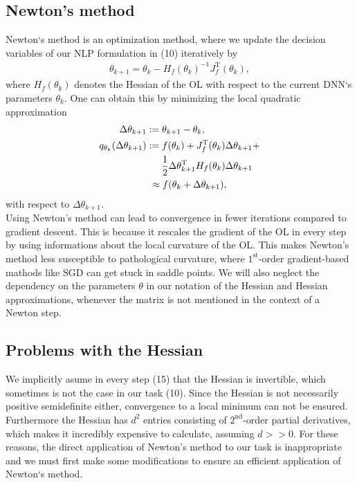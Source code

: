 \documentclass[conference]{IEEEtran}
\begin{document}
\subsection{Newton's method}
\noindent
Newton`s method is an optimization method, where we update the decision variables of our NLP formulation in (10) iteratively by
\begin{align}
 \theta_{k+1} = \theta_{k} -H_{f}(\theta_{k})^{-1} J_{f}^{\mathrm{T}}(\theta_{k}),
\end{align}
where $H_{f}(\theta_{k})$ denotes the Hessian of the OL with respect to the current DNN`s parameters $\theta_{k}$. One can obtain this by minimizing the local quadratic approximation
\begin{align}
\text{ }\Delta\theta_{k+1} &:= \theta_{k+1} - \theta_{k},\\
q_{\theta_{k}}(\Delta\theta_{k+1})&:= f(\theta_{k}) + J_{f}^{\mathrm{T}}(\theta_{k})\Delta\theta_{k+1} + \notag\\  
&\:\:\:\:\:\:\:\frac{1}{2}\Delta\theta_{k+1}^{\mathrm{T}}H_{f}(\theta_{k})\Delta\theta_{k+1}\\
&\text{ }\approx f(\theta_{k} + \Delta\theta_{k+1}),
\end{align}
with respect to $\Delta\theta_{k+1}$. \\
Using Newton's method can lead to convergence in fewer iterations compared to gradient descent. This is because it rescales the gradient of the OL in every step by using informations about the local curvature of the OL. This makes Newton's method less susceptible to pathological curvature, where $1^{\text{st}}$-order gradient-based mathods like SGD can get stuck in saddle points. We will also neglect the dependency on the parameters $\theta$ in our notation of the Hessian and Hessian approximations, whenever the matrix is not mentioned in the context of a Newton step.


\subsection{Problems with the Hessian}
\noindent
We implicitly asume in every step (15) that the Hessian is invertible, which sometimes is not the case in our task (10). Since the Hessian is not necessarily positive semidefinite either, convergence to a local minimum can not be ensured. Furthermore the Hessian has $d^{2}$ entries consisting of $2^{\text{nd}}$-order partial derivatives, which makes it incredibly expensive to calculate, assuming $d>>0$. For these reasons, the direct application of Newton's method to our task is inappropriate and we must first make some modifications to ensure an efficient application of Newton`s method.
\end{document}
